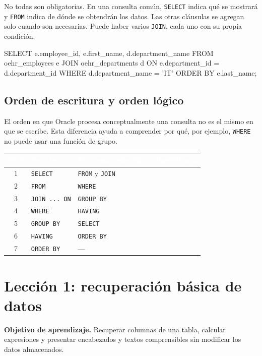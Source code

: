 \documentclass[10pt,letterpaper]{article}
\newenvironment{objetivoleccion}
  {\par\smallskip\noindent\color{tintasql}\small}
  {\par\medskip}
\begin{document}
No todas son obligatorias. En una consulta común, \lstinline|SELECT| indica qué
se mostrará y \lstinline|FROM| indica de dónde se obtendrán los datos. Las otras
cláusulas se agregan solo cuando son necesarias. Puede haber varios
\lstinline|JOIN|, cada uno con su propia condición.

\begin{sqlexample}
SELECT e.employee_id,
       e.first_name,
       d.department_name
FROM oehr_employees e
JOIN oehr_departments d
  ON e.department_id = d.department_id
WHERE d.department_name = 'IT'
ORDER BY e.last_name;
\end{sqlexample}

\subsection{Orden de escritura y orden lógico}

El orden en que Oracle procesa conceptualmente una consulta no es el mismo en
que se escribe. Esta diferencia ayuda a comprender por qué, por ejemplo,
\lstinline|WHERE| no puede usar una función de grupo.

\begin{center}
\begin{tabular}{cll}
\toprule
\rowcolor{azulsql}
\textcolor{white}{\textbf{Paso}} & \textcolor{white}{\textbf{Escritura}} &
\textcolor{white}{\textbf{Procesamiento lógico simplificado}} \\
\midrule
1 & \lstinline|SELECT| & \lstinline|FROM| y \lstinline|JOIN| \\
2 & \lstinline|FROM| & \lstinline|WHERE| \\
3 & \lstinline|JOIN ... ON| & \lstinline|GROUP BY| \\
4 & \lstinline|WHERE| & \lstinline|HAVING| \\
5 & \lstinline|GROUP BY| & \lstinline|SELECT| \\
6 & \lstinline|HAVING| & \lstinline|ORDER BY| \\
7 & \lstinline|ORDER BY| & --- \\
\bottomrule
\end{tabular}
\end{center}

\section{Lección 1: recuperación básica de datos}

\begin{objetivoleccion}
\textbf{Objetivo de aprendizaje.} Recuperar columnas de una tabla, calcular
expresiones y presentar encabezados y textos comprensibles sin modificar los
datos almacenados.
\end{objetivoleccion}
\end{document}
